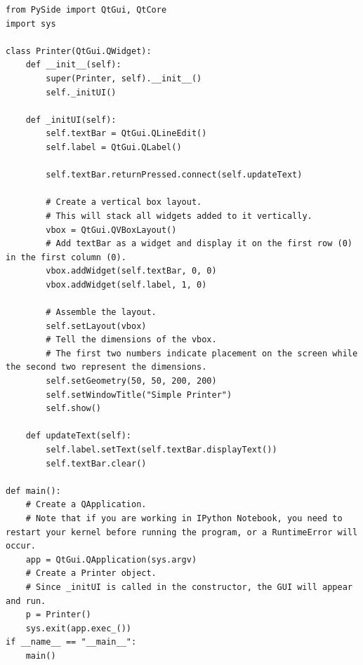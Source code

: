 \begin{lstlisting}
from PySide import QtGui, QtCore
import sys

class Printer(QtGui.QWidget):
	def __init__(self):
		super(Printer, self).__init__()
		self._initUI()

	def _initUI(self):
		self.textBar = QtGui.QLineEdit()
		self.label = QtGui.QLabel()
		
		self.textBar.returnPressed.connect(self.updateText)
	
		# Create a vertical box layout.
		# This will stack all widgets added to it vertically.
		vbox = QtGui.QVBoxLayout()
		# Add textBar as a widget and display it on the first row (0) in the first column (0).
        vbox.addWidget(self.textBar, 0, 0)
		vbox.addWidget(self.label, 1, 0)
		
		# Assemble the layout.
		self.setLayout(vbox)
		# Tell the dimensions of the vbox.
		# The first two numbers indicate placement on the screen while the second two represent the dimensions.
		self.setGeometry(50, 50, 200, 200)
		self.setWindowTitle("Simple Printer")
		self.show()
	
	def updateText(self):
		self.label.setText(self.textBar.displayText())
		self.textBar.clear()
		
def main():
	# Create a QApplication.
    # Note that if you are working in IPython Notebook, you need to restart your kernel before running the program, or a RuntimeError will occur.
	app = QtGui.QApplication(sys.argv)
	# Create a Printer object.
    # Since _initUI is called in the constructor, the GUI will appear and run.
	p = Printer()
	sys.exit(app.exec_())
if __name__ == "__main__":
	main()

\end{lstlisting}

